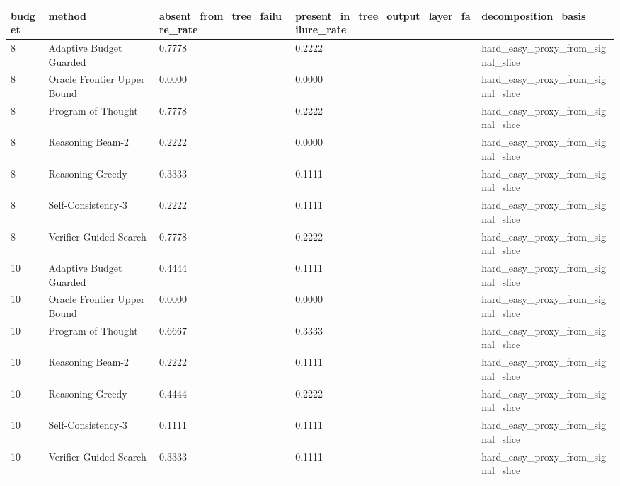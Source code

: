 \begin{tabular}{lllll}
\hline
budget & method & absent_from_tree_failure_rate & present_in_tree_output_layer_failure_rate & decomposition_basis \\
\hline
8 & Adaptive Budget Guarded & 0.7778 & 0.2222 & hard_easy_proxy_from_signal_slice \\
8 & Oracle Frontier Upper Bound & 0.0000 & 0.0000 & hard_easy_proxy_from_signal_slice \\
8 & Program-of-Thought & 0.7778 & 0.2222 & hard_easy_proxy_from_signal_slice \\
8 & Reasoning Beam-2 & 0.2222 & 0.0000 & hard_easy_proxy_from_signal_slice \\
8 & Reasoning Greedy & 0.3333 & 0.1111 & hard_easy_proxy_from_signal_slice \\
8 & Self-Consistency-3 & 0.2222 & 0.1111 & hard_easy_proxy_from_signal_slice \\
8 & Verifier-Guided Search & 0.7778 & 0.2222 & hard_easy_proxy_from_signal_slice \\
10 & Adaptive Budget Guarded & 0.4444 & 0.1111 & hard_easy_proxy_from_signal_slice \\
10 & Oracle Frontier Upper Bound & 0.0000 & 0.0000 & hard_easy_proxy_from_signal_slice \\
10 & Program-of-Thought & 0.6667 & 0.3333 & hard_easy_proxy_from_signal_slice \\
10 & Reasoning Beam-2 & 0.2222 & 0.1111 & hard_easy_proxy_from_signal_slice \\
10 & Reasoning Greedy & 0.4444 & 0.2222 & hard_easy_proxy_from_signal_slice \\
10 & Self-Consistency-3 & 0.1111 & 0.1111 & hard_easy_proxy_from_signal_slice \\
10 & Verifier-Guided Search & 0.3333 & 0.1111 & hard_easy_proxy_from_signal_slice \\
\hline
\end{tabular}
